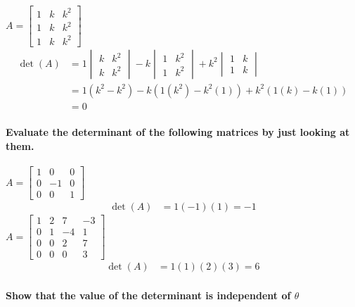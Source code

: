 \documentclass[
  letterpaper,
  DIV=11,
  numbers=noendperiod]{scrartcl}
\let\oldparagraph\paragraph
\renewcommand{\paragraph}[1]{\oldparagraph{#1}\mbox{}}
\begin{document}
\(A = \begin{bmatrix}1 & k & k^2 \\ 1 & k & k^2 \\ 1 & k & k^2\end{bmatrix}\)
\begin{align*}
\det(A) &= 1\begin{vmatrix}k & k^2 \\ k & k^2\end{vmatrix}-k\begin{vmatrix}1 & k^2 \\ 1 & k^2\end{vmatrix}+k^2\begin{vmatrix}1 & k \\ 1 & k\end{vmatrix} \\
&= 1(k^2-k^2)-k(1(k^2)-k^2(1))+k^2(1(k)-k(1)) \\
&= 0
\end{align*}

\paragraph{Evaluate the determinant of the following matrices by just
looking at
them.}\label{evaluate-the-determinant-of-the-following-matrices-by-just-looking-at-them.}

\(A=\begin{bmatrix}1 & 0 & 0 \\ 0 & -1 & 0 \\ 0 & 0 & 1 \end{bmatrix}\)
\begin{align*}
\det(A) &= 1(-1)(1) = -1
\end{align*}
\(A=\begin{bmatrix}1 & 2 & 7 & -3 \\ 0 & 1 & -4 & 1 \\ 0 & 0 & 2 & 7 \\ 0 & 0 & 0 & 3 \end{bmatrix}\)
\begin{align*}
\det(A) &= 1(1)(2)(3) = 6
\end{align*}

\paragraph{\texorpdfstring{Show that the value of the determinant is
independent of
\(\theta\)}{Show that the value of the determinant is independent of \textbackslash theta}}\label{show-that-the-value-of-the-determinant-is-independent-of-theta}
\end{document}

